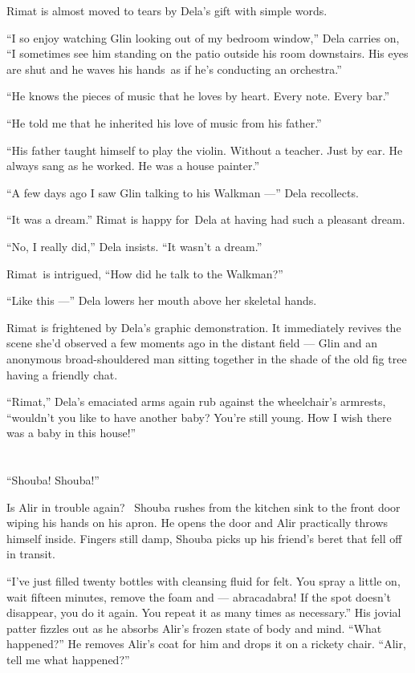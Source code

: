 \documentclass[twoside,11pt]{book}
\begin{document}
Rimat is almost moved to tears by Dela's gift with simple words.

``I so enjoy watching Glin looking out of my bedroom window,'' Dela carries on,
``I sometimes see him standing on the patio outside his room downstairs. His eyes are shut and he waves
his hands~as if he's conducting an orchestra.''

``He knows the pieces of music that he loves by heart. Every note. Every bar.''

``He told me that he inherited his love of music from his father.''

``His father taught himself to play the violin. Without a teacher. Just by ear. He always sang as he
worked. He was a house painter.''

``A few days ago I saw Glin talking to his Walkman ---'' Dela recollects.

``It was a dream.'' Rimat is happy for~Dela at having had such a pleasant dream.

``No, I really did,'' Dela insists. ``It wasn't a dream.''

Rimat~is intrigued, ``How did he talk to the Walkman?''

``Like this ---'' Dela lowers her mouth above her skeletal hands.

Rimat is frightened by Dela's graphic demonstration. It immediately revives the scene she'd observed a few moments ago
in the distant field --- Glin and an anonymous broad-shouldered man sitting together in the shade of the old fig tree
having a friendly chat.

``Rimat,'' Dela's emaciated arms again rub against the wheelchair's armrests,
``wouldn't you like to have another baby? You're still young. How I wish there was a baby in this
house!''


\bigskip

\chapter{}

``Shouba! Shouba!''

Is Alir in trouble again?~ Shouba rushes from the kitchen sink to the front door wiping his hands on his apron. He opens
the door and Alir practically throws himself inside. Fingers still damp, Shouba picks up his friend's beret that fell
off in transit.

``I've just filled twenty bottles with cleansing fluid for felt. You spray a little on, wait fifteen
minutes, remove the foam and --- abracadabra! If the spot doesn't disappear, you do it again. You repeat it as many times
as necessary.'' His jovial patter fizzles out as he absorbs Alir's frozen state of body and mind.
``What happened?'' He removes Alir's coat for him and drops it on a rickety
chair.  ``Alir, tell me what happened?''
\end{document}
